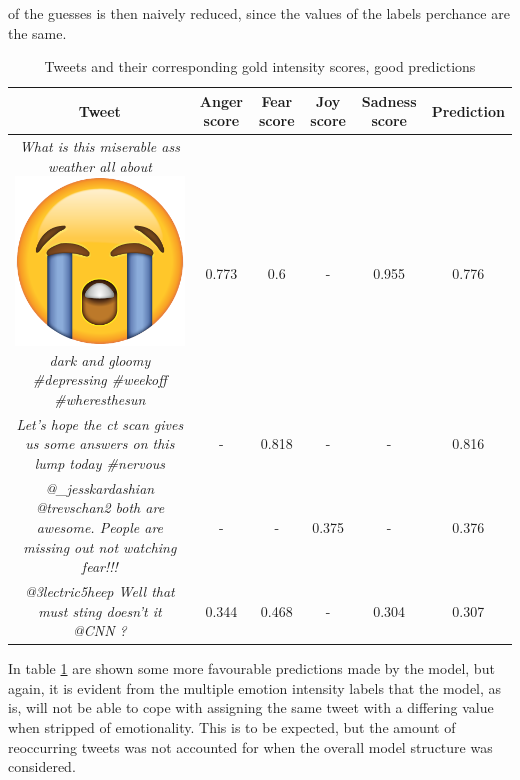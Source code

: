  of the guesses is then naively reduced, since the values of the labels perchance are the same.\\
\begin{table}[H]
\begin{tabular}{c|c|c|c|c|c|}
Tweet & Anger score & Fear score & Joy score & Sadness score & Prediction  \\ \hline
\parbox[t]{6cm}{\textit{What is this miserable ass weather all about \includegraphics[scale=0.015]{pictures/loudly_crying_face_emoji.png} dark and gloomy \#depressing \#weekoff \#wheresthesun}} & 0.773 & 0.6 & - & 0.955 & 0.776\\ \hline
\parbox[t]{6cm}{\textit{Let's hope the ct scan gives us some answers on this lump today \#nervous}} & - & 0.818 & - & - & 0.816\\ \hline
\parbox[t]{6cm}{\textit{@\_jesskardashian @trevschan2 both are awesome.  People are missing out not watching fear!!!}} & - & - & 0.375 & - & 0.376\\ \hline
\parbox[t]{6cm}{\textit{@3lectric5heep Well that must sting doesn't it @CNN ?}} & 0.344 & 0.468 & - & 0.304 & 0.307
\end{tabular}
\caption{Tweets and their corresponding gold intensity scores, good predictions}
\label{tab:regerrorlow}
\end{table}
In table \ref{tab:regerrorlow} are shown some more favourable predictions made by the model, but again, it is evident from the multiple emotion intensity labels that the model, as is, will not be able to cope with assigning the same tweet with a differing value when stripped of emotionality. This is to be expected, but the amount of reoccurring tweets was not accounted for when the overall model structure was considered.


